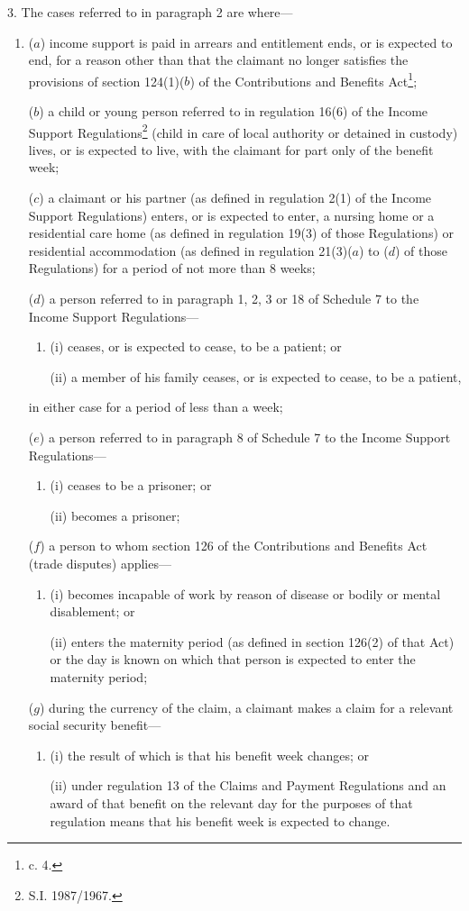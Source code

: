 \documentclass[12pt,a4paper]{article}
\begin{document}
3.  The cases referred to in paragraph 2 are where—
\begin{enumerate}\item[]
($a$) income support is paid in arrears and entitlement ends, or is expected to end, for a reason other than that the claimant no longer satisfies the provisions of section 124(1)($b$)  of the Contributions and Benefits Act\footnote{ c. 4.};

($b$) a child or young person referred to in regulation 16(6) of the Income Support Regulations\footnote{\frenchspacing S.I. 1987/1967.} (child in care of local authority or detained in custody) lives, or is expected to live, with the claimant for part only of the benefit week;

($c$) a claimant or his partner (as defined in regulation 2(1) of the Income Support Regulations) enters, or is expected to enter, a nursing home or a residential care home (as defined in regulation 19(3) of those Regulations) or residential accommodation (as defined in regulation 21(3)($a$)  to ($d$)  of those Regulations) for a period of not more than 8 weeks;

($d$) a person referred to in paragraph 1, 2, 3 or 18 of Schedule 7 to the Income Support Regulations—
\begin{enumerate}\item[]
(i) ceases, or is expected to cease, to be a patient; or

(ii) a member of his family ceases, or is expected to cease, to be a patient,
\end{enumerate}
in either case for a period of less than a week;

($e$) a person referred to in paragraph 8 of Schedule 7 to the Income Support Regulations—
\begin{enumerate}\item[]
(i) ceases to be a prisoner; or

(ii) becomes a prisoner;
\end{enumerate}

($f$) a person to whom section 126 of the Contributions and Benefits Act (trade disputes) applies—
\begin{enumerate}\item[]
(i) becomes incapable of work by reason of disease or bodily or mental disablement; or

(ii) enters the maternity period (as defined in section 126(2) of that Act) or the day is known on which that person is expected to enter the maternity period;
\end{enumerate}

($g$) during the currency of the claim, a claimant makes a claim for a relevant social security benefit—
\begin{enumerate}\item[]
(i) the result of which is that his benefit week changes; or

(ii) under regulation 13 of the Claims and Payment Regulations and an award of that benefit on the relevant day for the purposes of that regulation means that his benefit week is expected to change.
\end{enumerate}
\end{enumerate}
\end{document}
